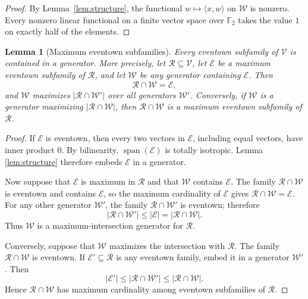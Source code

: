 \documentclass[11pt]{article}
\newtheorem{lemma}[theorem]{Lemma}
\newcommand{\Span}{\operatorname{span}}
\begin{document}
\begin{proof}
By Lemma~\ref{lem:structure}, the functional
\(w\mapsto\langle x,w\rangle\) on \(\mathcal W\) is nonzero.  Every
nonzero linear functional on a finite vector space over \(\mathbb F_2\)
takes the value \(1\) on exactly half of the elements.
\end{proof}

\begin{lemma}[Maximum eventown subfamilies]\label{lem:maximum-eventown}
Every eventown subfamily of \(\mathcal V\) is contained in a generator.  More
precisely, let \(\mathcal R\subseteq\mathcal V\), let \(\mathcal E\) be a
maximum eventown subfamily of \(\mathcal R\), and let \(\mathcal W\) be any
generator containing \(\mathcal E\).  Then
\[
 \mathcal R\cap\mathcal W=\mathcal E,
\]
and \(\mathcal W\) maximizes \(|\mathcal R\cap\mathcal W'|\) over all
generators \(\mathcal W'\).  Conversely, if \(\mathcal W\) is a generator
maximizing \(|\mathcal R\cap\mathcal W|\), then
\(\mathcal R\cap\mathcal W\) is a maximum eventown subfamily of
\(\mathcal R\).
\end{lemma}

\begin{proof}
If \(\mathcal E\) is eventown, then every two vectors in
\(\mathcal E\), including equal vectors, have inner product \(0\).  By
bilinearity, \(\Span(\mathcal E)\) is totally isotropic.  Lemma
\ref{lem:structure} therefore embeds \(\mathcal E\) in a generator.

Now suppose that \(\mathcal E\) is maximum in \(\mathcal R\) and that
\(\mathcal W\) contains \(\mathcal E\).  The family
\(\mathcal R\cap\mathcal W\) is eventown and contains \(\mathcal E\), so
the maximum cardinality of \(\mathcal E\) gives
\(\mathcal R\cap\mathcal W=\mathcal E\).  For any other generator
\(\mathcal W'\), the family \(\mathcal R\cap\mathcal W'\) is eventown;
therefore
\[
 |\mathcal R\cap\mathcal W'|
 \le |\mathcal E|
 =|\mathcal R\cap\mathcal W|.
\]
Thus \(\mathcal W\) is a maximum-intersection generator for
\(\mathcal R\).

Conversely, suppose that \(\mathcal W\) maximizes the intersection with
\(\mathcal R\).  The family \(\mathcal R\cap\mathcal W\) is eventown.  If
\(\mathcal E'\subseteq\mathcal R\) is any eventown family, embed it in a
generator \(\mathcal W'\).  Then
\[
 |\mathcal E'|
 \le |\mathcal R\cap\mathcal W'|
 \le |\mathcal R\cap\mathcal W|.
\]
Hence \(\mathcal R\cap\mathcal W\) has maximum cardinality among eventown
subfamilies of \(\mathcal R\).
\end{proof}
\end{document}
